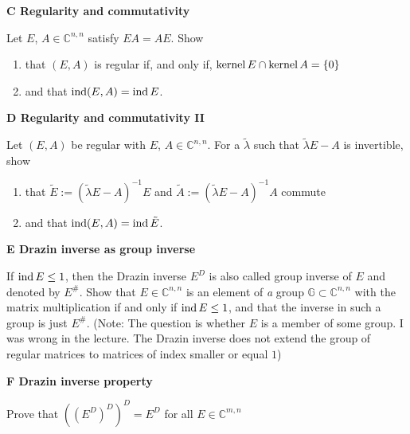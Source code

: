 \documentclass[a4paper,10pt]{article}
\begin{document}
\smallskip

{\bf C Regularity and commutativity}

Let $E$, $A\in \mathbb C^{n,n}$ satisfy $EA=AE$. Show
\begin{enumerate}
	\item that $(E, A)$ is regular if, and only if, $\operatorname{kernel} E \cap \operatorname{kernel} A = \{0\}$
	\item and that $\operatorname{ind} (E,A) = \operatorname{ind} E$.
\end{enumerate}
\smallskip

{\bf D Regularity and commutativity II}

Let $(E,A)$ be regular with $E$, $A\in \mathbb C^{n,n}$. For a $\tilde \lambda$ such that $\tilde \lambda E - A$ is invertible, show
\begin{enumerate}
	\item that $\tilde E := (\tilde \lambda E - A)^{-1}E$ and $\tilde A := (\tilde \lambda E - A)^{-1}A$ commute
	\item and that $\operatorname{ind} (E, A) = \operatorname{ind} \tilde E$.
\end{enumerate}
\smallskip

{\bf E Drazin inverse as group inverse}

If $\operatorname{ind} E \leq 1$, then the Drazin inverse $E^D$ is also called group inverse of $E$ and denoted by $E^\#$. Show that $E \in \mathbb C^{n,n}$ is an element of \emph{a} group $\mathbb G \subset \mathbb C^{n,n}$ with the matrix multiplication if and only if $\operatorname{ind} E \leq 1$, and that the inverse in such a group is just $E^\#$. (Note: The question is whether $E$ is a member of some group. I was wrong in the lecture. The Drazin inverse does not extend the group of regular matrices to matrices of index smaller or equal $1$)
\smallskip

{\bf F Drazin inverse property}

Prove that $( ( E^D)^D)^D=E^D$ for all $E\in \mathbb C^{m,n}$ 
\end{document}
